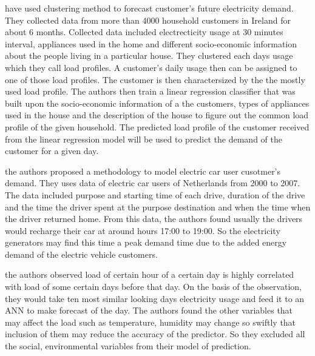 \cite{mcloughlin2015clustering} have used clustering method to forecast customer's future electricity demand. They collected data from more than 4000 household customers in Ireland for about 6 months. Collected data included electrecticity usage at 30 minutes interval, appliances used in the home and different socio-economic information about the people living in a particular house. They clustered each days usage which they call load profiles. A customer's daily usage then can be assigned to one of those load profiles. The customer is then charactersized by the the mostly used load profile. The authors then train a linear regression classifier that was built upon the socio-economic information of a the customers, types of appliances used in the house and the description of the house to figure out the common load profile of the given household. The predicted load profile of the customer received from the linear regression model will be used to predict the demand of the customer for a given day.
 

\cite{lampropoulos2010methodology} the authors proposed a methodology to model electric car user cusotmer's demand. They uses data of electric car users of Netherlands from 2000 to 2007. The data included purpose and starting time of each drive, duration of the drive and the time the driver spent at the purpose destination and when the time when the driver returned home. From this data, the authors found usually the drivers would recharge their car at around hours 17:00 to 19:00. So the electricity generators may find this time a peak demand time due to the added energy demand of the electric vehicle customers. 

\cite{liu2006accurate} the authors observed load of certain hour of a certain day is highly correlated with load of some certain days before that day. On the basis of the observation, they would take ten most similar looking days electricity usage and feed it to an ANN to make forecast of the day. The authors found the other variables that may affect the load such as temperature, humidity may change so swiftly that inclusion of them may reduce the accuracy of the predictor. So they excluded all the social, environmental variables from their model of prediction.